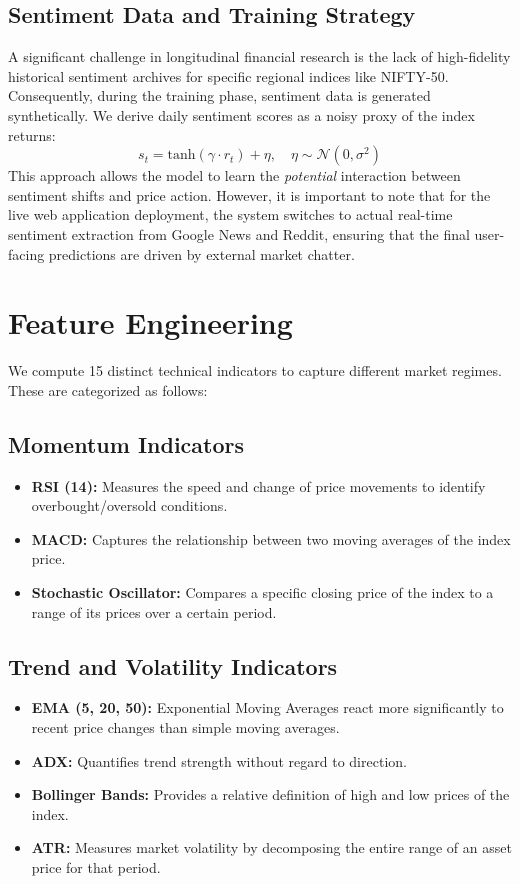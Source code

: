 \documentclass[conference]{IEEEtran}
\begin{document}
\subsection{Sentiment Data and Training Strategy}
A significant challenge in longitudinal financial research is the lack of high-fidelity historical sentiment archives for specific regional indices like NIFTY-50. Consequently, during the training phase, sentiment data is generated synthetically. We derive daily sentiment scores as a noisy proxy of the index returns:
\begin{equation}
s_t = \text{tanh}(\gamma \cdot r_t) + \eta, \quad \eta \sim \mathcal{N}(0, \sigma^2)
\end{equation}
This approach allows the model to learn the \emph{potential} interaction between sentiment shifts and price action. However, it is important to note that for the live web application deployment, the system switches to actual real-time sentiment extraction from Google News and Reddit, ensuring that the final user-facing predictions are driven by external market chatter.

\section{Feature Engineering}
We compute 15 distinct technical indicators to capture different market regimes. These are categorized as follows:

\subsection{Momentum Indicators}
\begin{itemize}
    \item \textbf{RSI (14):} Measures the speed and change of price movements to identify overbought/oversold conditions.
    \item \textbf{MACD:} Captures the relationship between two moving averages of the index price.
    \item \textbf{Stochastic Oscillator:} Compares a specific closing price of the index to a range of its prices over a certain period.
\end{itemize}

\subsection{Trend and Volatility Indicators}
\begin{itemize}
    \item \textbf{EMA (5, 20, 50):} Exponential Moving Averages react more significantly to recent price changes than simple moving averages.
    \item \textbf{ADX:} Quantifies trend strength without regard to direction.
    \item \textbf{Bollinger Bands:} Provides a relative definition of high and low prices of the index.
    \item \textbf{ATR:} Measures market volatility by decomposing the entire range of an asset price for that period.
\end{itemize}
\end{document}
